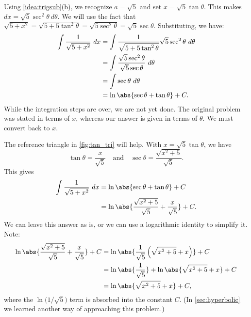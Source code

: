 {Using \autoref{idea:trigsub}(b), we recognize $a=\sqrt{5}$ and  set $x= \sqrt{5}\tan \theta$. This makes $dx = \sqrt{5}\sec^2\theta\ d\theta$. We will use the fact that $\sqrt{5+x^2} = \sqrt{5+5\tan^2\theta} = \sqrt{5\sec^2\theta} = \sqrt{5}\sec\theta.$ Substituting, we have:
\begin{align*}
\int \frac{1}{\sqrt{5+x^2}}\ dx &= \int \frac{1}{\sqrt{5+5\tan^2\theta}}\sqrt{5}\sec^2\theta\ d\theta \\
			&= \int \frac{\sqrt{5}\sec^2\theta}{\sqrt{5}\sec\theta} \ d\theta\\
			&= \int \sec\theta\ d\theta\\
			&= \ln\abs{\sec\theta+\tan\theta}+C.
\end{align*}
While the integration steps are over, we are not yet done. The original problem was stated in terms of $x$, whereas our answer is given in terms of $\theta$. We must convert back to $x$.

The reference triangle in \autoref{fig:tan_tri} will help. With $x=\sqrt{5}\tan\theta$, we have 
$$\tan \theta = \frac x{\sqrt{5}}\quad \text{and}\quad \sec\theta = \frac{\sqrt{x^2+5}}{\sqrt{5}}.$$
This gives
\begin{align*}
	\int\frac1{\sqrt{5+x^2}}\ dx
	&= \ln\abs{\sec\theta+\tan\theta}+C \\
	&= \ln\abs{\frac{\sqrt{x^2+5}}{\sqrt5}+ \frac x{\sqrt5}}+C.
\end{align*}
We can leave this answer as is, or we can use a logarithmic identity to simplify it. Note:
\begin{align*}
	\ln\abs{\frac{\sqrt{x^2+5}}{\sqrt5}+ \frac x{\sqrt5}}+C
	&= \ln\abs{\frac1{\sqrt5}\left(\sqrt{x^2+5}+ x\right)}+C \\
	&= \ln\abs{\frac1{\sqrt5}} + \ln\abs{\sqrt{x^2+5}+ x}+C\\
	&=	\ln\abs{\sqrt{x^2+5}+ x}+C,
\end{align*}
where the $\ln\big(1/\sqrt5\big)$ term is absorbed into the constant $C$. (In \autoref{sec:hyperbolic} we learned another way of approaching this problem.)}

